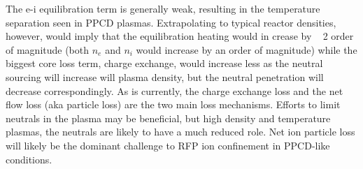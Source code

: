 The e-i equilibration term is generally weak, resulting in the temperature separation seen in PPCD plasmas. Extrapolating to typical reactor densities, however, would imply that the equilibration heating would in crease by ~ 2 order of magnitude (both $n_e$ and $n_i$ would increase by an order of magnitude) while the biggest core loss term, charge exchange, would increase less as the neutral sourcing will increase will plasma density, but the neutral penetration will decrease correspondingly. As is currently, the charge exchange loss and the net flow loss (aka particle loss) are the two main loss mechanisms. Efforts to limit neutrals in the plasma may be beneficial, but high density and temperature plasmas, the neutrals are likely to have a much reduced role. Net ion particle loss will likely be the dominant challenge to RFP ion confinement in PPCD-like conditions. 

